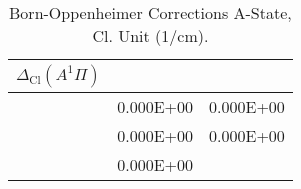 \begin{table}[h]
\begin{tabular}{crr}
\toprule
$\Delta_\textrm{Cl} (A^1\Pi)$\\ \midrule 
& 0.000E+00 & 0.000E+00 \\
& 0.000E+00 & 0.000E+00 \\
& 0.000E+00 \\
\bottomrule
\end{tabular}\caption{Born-Oppenheimer Corrections A-State, Cl. Unit (1/cm).}\end{table}

